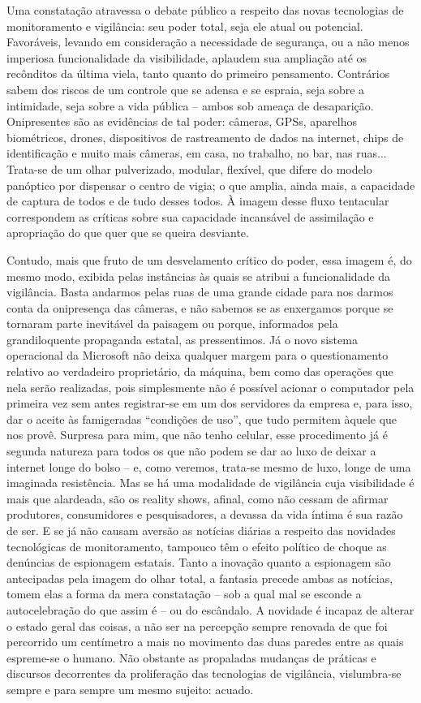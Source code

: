Uma constatação atravessa o debate público a respeito das novas
tecnologias de monitoramento e vigilância: seu poder total, seja ele
atual ou potencial. Favoráveis, levando em consideração a necessidade de
segurança, ou a não menos imperiosa funcionalidade da visibilidade,
aplaudem sua ampliação até os recônditos da última viela, tanto quanto
do primeiro pensamento. Contrários sabem dos riscos de um controle que
se adensa e se espraia, seja sobre a intimidade, seja sobre a vida
pública -- ambos sob ameaça de desaparição. Onipresentes são as
evidências de tal poder: câmeras, GPSs, aparelhos biométricos, drones,
dispositivos de rastreamento de dados na internet, chips de
identificação e muito mais câmeras, em casa, no trabalho, no bar, nas
ruas... Trata-se de um olhar pulverizado, modular, flexível, que difere
do modelo panóptico por dispensar o centro de vigia; o que amplia, ainda
mais, a capacidade de captura de todos e de tudo desses todos. À imagem
desse fluxo tentacular correspondem as críticas sobre sua capacidade
incansável de assimilação e apropriação do que quer que se queira
desviante.

Contudo, mais que fruto de um desvelamento crítico do poder, essa imagem
é, do mesmo modo, exibida pelas instâncias às quais se atribui a
funcionalidade da vigilância. Basta andarmos pelas ruas de uma grande
cidade para nos darmos conta da onipresença das câmeras, e não sabemos
se as enxergamos porque se tornaram parte inevitável da paisagem ou
porque, informados pela grandiloquente propaganda estatal, as
pressentimos. Já o novo sistema operacional da Microsoft não deixa
qualquer margem para o questionamento relativo ao verdadeiro
proprietário, da máquina, bem como das operações que nela serão
realizadas, pois simplesmente não é possível acionar o computador pela
primeira vez sem antes registrar-se em um dos servidores da empresa e,
para isso, dar o aceite às famigeradas ``condições de uso'', que tudo
permitem àquele que nos provê. Surpresa para mim, que não tenho celular,
esse procedimento já é segunda natureza para todos os que não podem se
dar ao luxo de deixar a internet longe do bolso -- e, como veremos,
trata-se mesmo de luxo, longe de uma imaginada resistência. Mas se há
uma modalidade de vigilância cuja visibilidade é mais que alardeada, são
os reality shows, afinal, como não cessam de afirmar produtores,
consumidores e pesquisadores, a devassa da vida íntima é sua razão de
ser. E se já não causam aversão as notícias diárias a respeito das
novidades tecnológicas de monitoramento, tampouco têm o efeito político
de choque as denúncias de espionagem estatais. Tanto a inovação quanto a
espionagem são antecipadas pela imagem do olhar total, a fantasia
precede ambas as notícias, tomem elas a forma da mera constatação -- sob
a qual mal se esconde a autocelebração do que assim é -- ou do
escândalo. A novidade é incapaz de alterar o estado geral das coisas, a
não ser na percepção sempre renovada de que foi percorrido um centímetro
a mais no movimento das duas paredes entre as quais espreme-se o humano.
Não obstante as propaladas mudanças de práticas e discursos decorrentes
da proliferação das tecnologias de vigilância, vislumbra-se sempre e
para sempre um mesmo sujeito: acuado.

